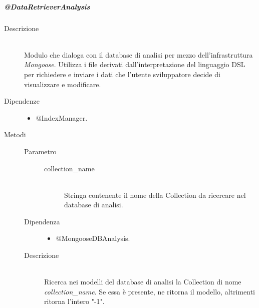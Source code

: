 \subparagraph{@DataRetrieverAnalysis}
\begin{description}
\item[Descrizione] \hfill \\
Modulo che dialoga con il database di analisi per mezzo dell'infrastruttura \textit{Mongoose}. Utilizza i file derivati dall'interpretazione del 
linguaggio DSL per richiedere e inviare i dati che l'utente sviluppatore decide di visualizzare e modificare.
\item[Dipendenze] \hfill 
\begin{itemize}
\item @IndexManager.
\end{itemize}

\item[Metodi]
\begin{mldescription}
	 \hfill 
		\begin{description}
			\item[Parametro] \hfill
				\begin{description}
					\item[collection\_name] \hfill \\
					Stringa contenente il nome della Collection da ricercare nel database di analisi.
				\end{description}
			\item[Dipendenza] \hfill
				\begin{itemize}
					\item @MongooseDBAnalysis.
				\end{itemize}
			\item[Descrizione] \hfill \\
			Ricerca nei modelli del database di analisi la Collection di nome \textit{collection\_name}.
Se essa è presente, ne ritorna il modello, altrimenti ritorna l'intero "-1".
		\end{description}


\end{mldescription}
\end{description}
